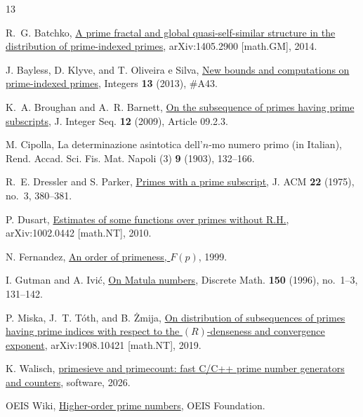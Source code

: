 \documentclass[11pt,a4paper]{article}
\theoremstyle{plain}
\theoremstyle{definition}
\begin{document}
\begin{thebibliography}{13}\small

R.~G. Batchko,
\href{https://arxiv.org/abs/1405.2900}{A prime fractal and global
quasi-self-similar structure in the distribution of prime-indexed primes},
arXiv:1405.2900 [math.GM], 2014.

J. Bayless, D. Klyve, and T. Oliveira e Silva,
\href{http://integers-ejcnt.org/n43/n43.Abstract.html}{New bounds and
computations on prime-indexed primes}, Integers \textbf{13} (2013),
\#A43.

K.~A. Broughan and A.~R. Barnett,
\href{https://cs.uwaterloo.ca/journals/JIS/VOL12/Broughan/broughan16.html}{On
the subsequence of primes having prime subscripts}, J. Integer Seq.
\textbf{12} (2009), Article 09.2.3.

M. Cipolla,
La determinazione asintotica dell'$n$-mo numero primo (in Italian),
Rend. Accad. Sci. Fis. Mat. Napoli (3) \textbf{9} (1903), 132--166.

R.~E. Dressler and S. Parker,
\href{https://doi.org/10.1145/321892.321900}{Primes with a prime
subscript}, J. ACM \textbf{22} (1975), no.~3, 380--381.

P. Dusart,
\href{https://arxiv.org/abs/1002.0442}{Estimates of some functions over
primes without R.H.}, arXiv:1002.0442 [math.NT], 2010.

N. Fernandez,
\href{http://www.borve.org/primeness/FOP.html}{An order of primeness,
$F(p)$}, 1999.

I. Gutman and A. Ivi\'c,
\href{https://doi.org/10.1016/0012-365X(95)00182-V}{On Matula numbers},
Discrete Math. \textbf{150} (1996), no.~1--3, 131--142.

P. Miska, J.~T. T\'oth, and B. \.Zmija,
\href{https://arxiv.org/abs/1908.10421}{On distribution of subsequences of
primes having prime indices with respect to the $(R)$-denseness and
convergence exponent}, arXiv:1908.10421 [math.NT], 2019.

K. Walisch,
\href{https://github.com/kimwalisch/primesieve}{primesieve and primecount:
fast C/C++ prime number generators and counters}, software, 2026.

OEIS Wiki,
\href{https://oeis.org/wiki/Higher-order_prime_numbers}{Higher-order prime
numbers}, OEIS Foundation.


\end{thebibliography}
\end{document}
